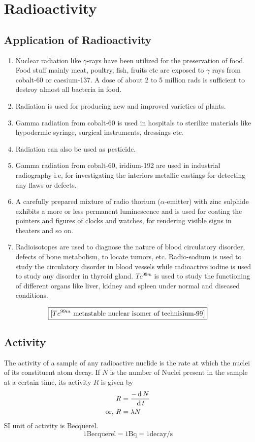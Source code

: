 \documentclass[../main.tex]{subfiles}
\begin{document}
\chapter{Radioactivity}
\section{Application of Radioactivity}
\begin{enumerate}
    \item Nuclear radiation like $ \gamma $-rays have been utilized for the preservation of food. Food stuff mainly meat, poultry, fish, fruits etc are exposed to $ \gamma $ rays from cobalt-60 or caesium-137. A dose of about 2 to 5 million rads is sufficient to destroy almost all bacteria in food.
    \item Radiation is used for producing new and improved varieties of plants.
    \item Gamma radiation from cobalt-60 is used in hospitals to sterilize materials like hypodermic syringe, surgical instruments, dressings etc.
    \item Radiation can also be used as pesticide.
    \item Gamma radiation from cobalt-60, iridium-192 are used in industrial radiography i.e, for investigating  the  interiors  metallic  castings  for  detecting  any  flaws  or     defects.
    \item A carefully prepared mixture of radio thorium ($ \alpha $-emitter) with zinc sulphide exhibits a more or less permanent luminescence and is used for coating the pointers and figures of clocks and watches, for rendering visible signs in theaters and so on.
    \item Radioisotopes are used to diagnose the nature of blood circulatory disorder, defects of bone metabolism, to locate tumors, etc. Radio-sodium is used to study the circulatory disorder in blood vessels while radioactive iodine is used to study any disorder in thyroid gland. $ Tc^{99m} $ is used to study the functioning of different organs like liver, kidney and spleen under normal and diseased conditions.
\end{enumerate}
\[
    \boxed{\text{[$ Tc^{99m} $  metastable nuclear isomer of technisium-99]}}
\]
\section{Activity}
The activity of a sample of any radioactive nuclide is the rate at which the nuclei of its constituent atom decay. If $ N $ is the number of Nuclei present in the sample at a certain time, its activity $ R $ is given by
\begin{align*}
    R&=\frac{-\,\mathrm{d}\, N}{\,\mathrm{d}\, t}\\
    \text{or, }R&=\lambda N
\end{align*}
SI unit of activity is Becquerel.
\[
    1 \text{Becquerel} = 1 \text{Bq} = 1 \text{decay/s}
\]
\end{document}
